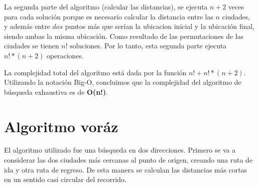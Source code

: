 \documentclass[10pt]{report}
\begin{document}
La segunda parte del algoritmo (calcular las distancias), se ejecuta $n + 2$ veces para cada solución porque es necesario calcular la distancia entre las $n$ ciudades, y además entre $dos$ puntos más que serían la ubicacion inicial y la ubicación final, siendo ambas la misma ubicación. Como resultado de las permutaciones de las ciudades se tienen $n!$ soluciones. Por lo tanto, esta segunda parte ejecuta $n! * (n+2)$ operaciones.

La complejidad total del algoritmo está dada por la función $n! + n! *(n+2)$. Utilizando la notación Big-O, concluimos que la complejidad del algoritmo de búsqueda exhaustiva es de \textbf{O(n!)}.

\section*{Algoritmo voráz}
El algoritmo utilizado fue una búsqueda en dos direcciones. Primero se va a considerar las dos ciudades más cercanas al punto de origen, creando una ruta de ida y otra ruta de regreso. De esta manera se calculan las distancias más cortas en un sentido casi circular del recorrido.
\end{document}
